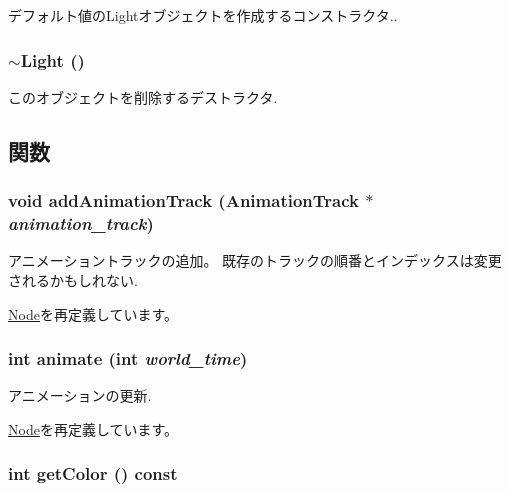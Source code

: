 デフォルト値のLightオブジェクトを作成するコンストラクタ.. \hypertarget{classm3g_1_1Light_f50d3d8cdb323e1a9fbd7bfac3aeba06}{
\subsubsection[{$\sim$Light}]{\setlength{\rightskip}{0pt plus 5cm}$\sim${\bf Light} ()}}
\label{classm3g_1_1Light_f50d3d8cdb323e1a9fbd7bfac3aeba06}


このオブジェクトを削除するデストラクタ. 

\subsection{関数}
\hypertarget{classm3g_1_1Light_415c0b110f95410ded9b85e5d99a496b}{
\subsubsection[{addAnimationTrack}]{\setlength{\rightskip}{0pt plus 5cm}void addAnimationTrack ({\bf AnimationTrack} $\ast$ {\em animation\_\-track})}}
\label{classm3g_1_1Light_415c0b110f95410ded9b85e5d99a496b}


アニメーショントラックの追加。 既存のトラックの順番とインデックスは変更されるかもしれない. 

\hyperlink{classm3g_1_1Node_415c0b110f95410ded9b85e5d99a496b}{Node}を再定義しています。\hypertarget{classm3g_1_1Light_8aad1ceab4c2a03609c8a42324ce484d}{
\subsubsection[{animate}]{\setlength{\rightskip}{0pt plus 5cm}int animate (int {\em world\_\-time})}}
\label{classm3g_1_1Light_8aad1ceab4c2a03609c8a42324ce484d}


アニメーションの更新. 

\hyperlink{classm3g_1_1Node_8aad1ceab4c2a03609c8a42324ce484d}{Node}を再定義しています。\hypertarget{classm3g_1_1Light_4cfa1931c265ec3412fe3f6408a1b4f5}{
\subsubsection[{getColor}]{\setlength{\rightskip}{0pt plus 5cm}int getColor () const}}
\label{classm3g_1_1Light_4cfa1931c265ec3412fe3f6408a1b4f5}


